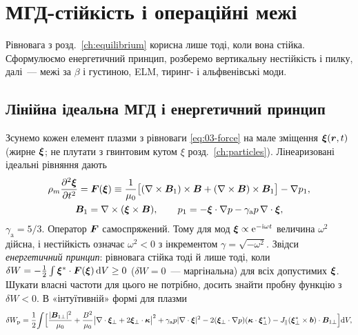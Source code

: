 \chapter{МГД-стійкість і операційні межі}\label{ch:stability}

Рівновага з розд.~\ref{ch:equilibrium} корисна лише тоді, коли вона стійка. Сформулюємо енергетичний принцип, розберемо вертикальну нестійкість і пилку, далі~--- межі за $\beta$ і густиною, ELM, тиринг- і альфвенівські моди.

\section{Лінійна ідеальна МГД і енергетичний принцип}\label{sec:07-energy}

\begin{outofcorpus}
Зсунемо кожен елемент плазми з рівноваги \eqref{eq:03-force} на мале зміщення $\bm{\xi}(\bm{r},t)$ (жирне $\bm{\xi}$; не плутати з гвинтовим кутом $\xi$ розд.~\ref{ch:particles}). Лінеаризовані ідеальні рівняння дають
\begin{equation}\label{eq:07-force}
\begin{gathered}
\rho_m\frac{\partial^2\bm{\xi}}{\partial t^2}=\bm{F}(\bm{\xi})\equiv\frac{1}{\mu_0}\big[(\nabla\times\bm{B}_1)\times\bm{B}+(\nabla\times\bm{B})\times\bm{B}_1\big]-\nabla p_1,\\
\bm{B}_1=\nabla\times(\bm{\xi}\times\bm{B}),\qquad p_1=-\bm{\xi}\cdot\nabla p-\gamma_{\mathrm a}p\,\nabla\cdot\bm{\xi},
\end{gathered}
\end{equation}
$\gamma_{\mathrm a}=5/3$. Оператор $\bm{F}$ самоспряжений. Тому для мод $\bm{\xi}\propto\mathrm{e}^{-\mathrm{i}\omega t}$ величина $\omega^2$ дійсна, і нестійкість означає $\omega^2<0$ з інкрементом $\gamma=\sqrt{-\omega^2}$. Звідси \emph{енергетичний принцип}: рівновага стійка тоді й лише тоді, коли $\delta W=-\tfrac12\int\bm{\xi}^*\cdot\bm{F}(\bm{\xi})\,\mathrm{d} V\ge0$ ($\delta W=0$~--- маргінальна) для всіх допустимих $\bm{\xi}$. Шукати власні частоти для цього не потрібно, досить знайти пробну функцію з $\delta W<0$. В «інтуїтивній» формі для плазми
\begin{equation}\label{eq:07-dW}
\delta W_{\mathrm p}=\frac12\!\int\!\Big[\frac{|\vect{B}_{1\perp}|^2}{\mu_0}+\frac{B^2}{\mu_0}\big|\grad\cdot\vect{\xi}_\perp+2\vect{\xi}_\perp\cdot\vect{\kappa}\big|^2+\gamma_{\mathrm a}p|\grad\cdot\vect{\xi}|^2
-2(\vect{\xi}_\perp\cdot\grad p)(\vect{\kappa}\cdot\vect{\xi}_\perp^*)-J_\parallel(\vect{\xi}_\perp^*\times\unitb)\cdot\vect{B}_{1\perp}\Big]\dd V,

\end{equation}
\end{outofcorpus}
